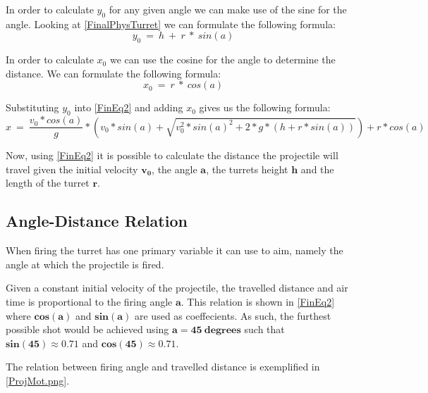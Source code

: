 In order to calculate $y_0$ for any given angle we can make use of the sine for
the angle. Looking at \autoref{FinalPhysTurret} we can formulate the following
formula:
\begin{equation}\label{Y0Eq}
y_0\ =\ h\ +\ r\ *\ sin(a)
\end{equation}\nl

In order to calculate $x_0$ we can use the cosine for the angle to determine the
distance. We can formulate the following formula:
\begin{equation}\label{Y0Eq}
x_0\ =\ r\ *\ cos(a)
\end{equation}

Substituting $y_0$ into \autoref{FinEq2} and adding $x_0$ gives
us the following formula:
\begin{equation}\label{FinEq3}
x\ =\ \frac{v_0*cos(a)}{g}* \left(
v_0*sin(a)+\sqrt{v_0^2*sin(a)^2+2*g*(h+r*sin(a))}\right)+r*cos(a)
\end{equation}

Now, using \autoref{FinEq2} it is possible to calculate the
distance the projectile will travel given the initial velocity $\mathbf{v_0}$,
the angle $\mathbf{a}$, the turrets height $\mathbf{h}$ and the length of the
turret $\mathbf{r}$.

\subsection{Angle-Distance Relation}
When firing the turret has one primary variable it can use to aim,
namely the angle at which the projectile is fired.


Given a constant initial velocity of the projectile, the travelled distance and
air time is proportional to the firing angle $\mathbf{a}$. This relation is
shown in \autoref{FinEq2} where $\mathbf{cos(a)}$ and $\mathbf{sin(a)}$ are used as
coeffecients. As such, the furthest possible shot would be achieved using
$\mathbf{a=45\ degrees}$ such that $\mathbf{sin(45)\approx 0.71}$ and
$\mathbf{cos(45)\approx 0.71}$.

The relation between firing angle and travelled distance is exemplified in
\autoref{ProjMot.png}.


